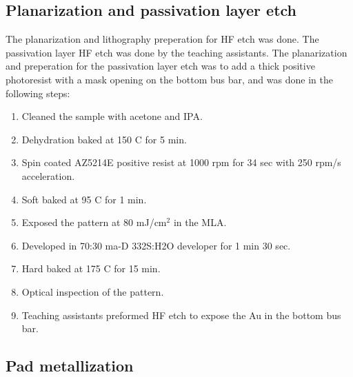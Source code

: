 


\subsection{Planarization and passivation layer etch}
\label{methods:Planarization}

The planarization and lithography preperation for HF etch was done. 
The passivation layer HF etch was done by the teaching assistants.
The planarization and preperation for the passivation layer etch was to add a thick positive photoresist with a mask opening on the bottom bus bar, and was done in the following steps:

\begin{enumerate}
    \item Cleaned the sample with acetone and IPA.
    \item Dehydration baked at 150 \textdegree C for 5 min.
    \item Spin coated AZ5214E positive resist at 1000 rpm for 34 sec with 250 rpm/s acceleration.
    \item Soft baked at 95 \textdegree C for 1 min.
    \item Exposed the pattern at 80 mJ/cm$^2$ in the MLA.
    \item Developed in 70:30 ma-D 332S:H2O developer for 1 min 30 sec.
    \item Hard baked at 175 \textdegree C for 15 min.
    \item Optical inspection of the pattern.
    \item Teaching assistants preformed HF etch to expose the Au in the bottom bus bar.
\end{enumerate}



\subsection{Pad metallization}
\label{methods:pad_metallization}


